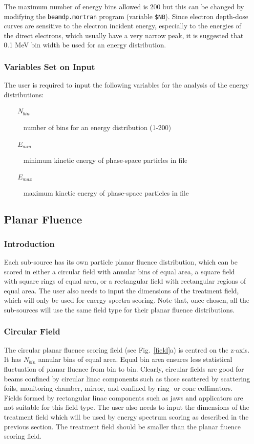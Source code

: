 \documentclass[12pt,twoside]{article}
\begin{document}
The maximum number of energy bins allowed is 200 but this can be changed
by modifying the {\tt beamdp.mortran} program (variable {\tt \$NB}). Since
electron depth-dose curves are sensitive to the electron incident energy,
especially to the energies of the direct electrons, which usually have a
very narrow peak, it is suggested that 0.1 MeV bin width be used for an
energy distribution.

\subsubsection{Variables Set on Input}
The user is required to input the following variables for the analysis of the energy distributions:
\begin{description}
\item [~~~~$N_{bin}$] number of bins for an energy distribution (1-200)
\item [~~~~$E_{min}$] minimum kinetic energy of phase-space particles in file
\item [~~~~$E_{max}$] maximum kinetic energy of phase-space particles in file
\end{description}


\subsection{Planar Fluence}
\subsubsection{Introduction}
Each sub-source has its own particle planar fluence distribution, which can be scored in either a circular field with annular bins of equal area, a square field with square rings of equal area, or a rectangular field with rectangular regions of equal area. The user also needs to input the dimensions of the treatment field, which will only be used for energy spectra scoring.
Note that, once chosen,  all the sub-sources will use the same field type for their planar fluence distributions.

\subsubsection{Circular Field}
The circular planar fluence scoring field (see Fig.~\ref{field}a) is
centred on the z-axis. It has $N_{bin}$ annular bins of equal area. Equal
bin area ensures less statistical fluctuation of planar fluence from bin
to bin. Clearly, circular fields are good for beams confined by circular
linac components such as those scattered by scattering foils, monitoring
chamber, mirror, and confined by ring- or cone-collimators. Fields formed
by rectangular linac components such as jaws and applicators are not
suitable for this field type. The user also needs to input the dimensions
of the treatment field which will be used by energy spectrum scoring as
described in the previous section. The treatment field should be smaller
than the planar fluence scoring field. \\
\end{document}
